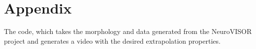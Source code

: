 
\section{Appendix}

The code\cite{neuropy}, which takes the morphology and data generated from the NeuroVISOR\cite{neuroVISOR} project and generates a video with the desired extrapolation properties.

\inputminted{python}{./code/extrapolateFromData.py}


